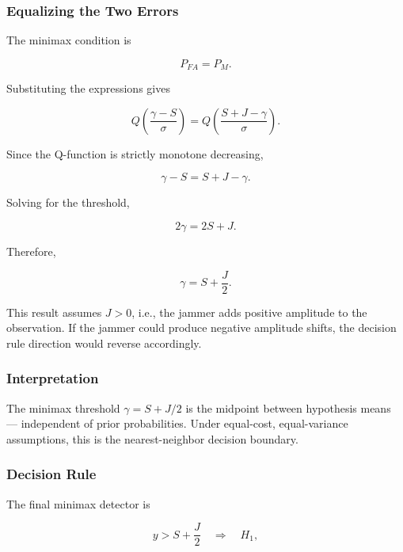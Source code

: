 \documentclass{article}
\begin{document}
\subsubsection{Equalizing the Two Errors}

The minimax condition is

\begin{equation}
P_{FA}=P_M.
\end{equation}

Substituting the expressions gives

\begin{equation}
Q\!\left(
\frac{\gamma-S}{\sigma}
\right)
=
Q\!\left(
\frac{S+J-\gamma}{\sigma}
\right).
\end{equation}

Since the Q-function is strictly monotone decreasing,

\begin{equation}
\gamma-S
=
S+J-\gamma.
\end{equation}

Solving for the threshold,

\begin{equation}
2\gamma
=
2S+J.
\end{equation}

Therefore,

\begin{equation}
\boxed{
\gamma
=
S+\frac{J}{2}
}.
\end{equation}

This result assumes $J > 0$, i.e., the jammer adds positive amplitude to the observation. If the jammer could produce negative amplitude shifts, the decision rule direction would reverse accordingly.

\subsubsection{Interpretation}

The minimax threshold $\gamma = S + J/2$ is the midpoint between hypothesis means — independent of prior probabilities. Under equal-cost, equal-variance assumptions, this is the nearest-neighbor decision boundary.

\subsubsection{Decision Rule}

The final minimax detector is

\begin{equation}
y > S+\frac{J}{2}
\quad \Rightarrow \quad H_1,
\end{equation}
\end{document}
